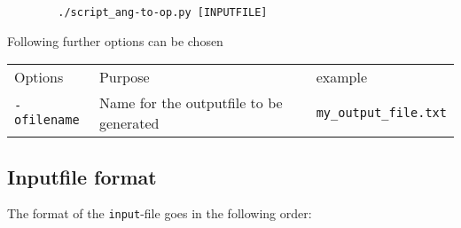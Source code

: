 \documentclass[parskip]{scrartcl}
\begin{document}
        \begin{verbatim}
        ./script_ang-to-op.py [INPUTFILE]
        \end{verbatim}

        Following further options can be chosen

        \begin{tabular}{lll}
        Options & Purpose & example
            \\\texttt{-ofilename}     & Name for the outputfile to be generated
            & \texttt{my\_output\_file.txt}
        \end{tabular}
    \subsection{Inputfile format}
        The format of the \texttt{input}-file goes in the following order:
\end{document}
